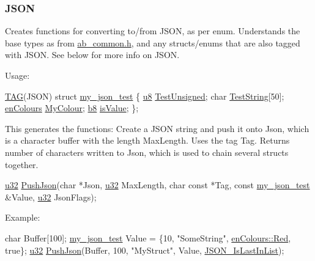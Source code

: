 \subsubsection*{J\+S\+ON}

Creates functions for converting to/from J\+S\+ON, as per enum. Understands the base types as from {\ttfamily \hyperlink{ab__common_8h}{ab\+\_\+common.\+h}}, and any structs/enums that are also tagged with {\ttfamily J\+S\+ON}. See below for more info on J\+S\+ON.

Usage\+: 
\begin{DoxyCode}
\hyperlink{Generated__001_8h_ad9b15e5b6d9b1ed55b76d9916ff6dec2}{TAG}(JSON)
\textcolor{keyword}{struct }\hyperlink{structmy__json__test}{my\_json\_test}
\{
    \hyperlink{ab__common_8h_a92c50087ca0e64fa93fc59402c55f8ca}{u8} \hyperlink{structmy__json__test_a0ea8af0c0061131955753275ad70dba4}{TestUnsigned};
    \textcolor{keywordtype}{char} \hyperlink{structmy__json__test_a497da009ff7ce7742cf99571b0752227}{TestString}[50];
    \hyperlink{PreprocTest_8h_a081cf1a0e70d6e2bd48c98f457742877}{enColours} \hyperlink{structmy__json__test_a6f1212d5aaf1f688e8887d5614d510ca}{MyColour};
    \hyperlink{ab__common_8h_a70e369648385b50f2d0588e8e8745275}{b8} \hyperlink{structmy__json__test_a55bffca96cce85232e33fc0c619a9eab}{isValue};
\};
\end{DoxyCode}


This generates the functions\+: Create a J\+S\+ON string and push it onto {\ttfamily Json}, which is a character buffer with the length {\ttfamily Max\+Length}. Uses the tag {\ttfamily Tag}. Returns number of characters written to {\ttfamily Json}, which is used to chain several structs together. 
\begin{DoxyCode}
\hyperlink{ab__common_8h_afaa62991928fb9fb18ff0db62a040aba}{u32} \hyperlink{test_8h_a2e06da4f01d3cba9c9d2cf6687ed8bd5}{PushJson}(\textcolor{keywordtype}{char} *Json, \hyperlink{ab__common_8h_afaa62991928fb9fb18ff0db62a040aba}{u32} MaxLength, \textcolor{keywordtype}{char} \textcolor{keyword}{const} *Tag, \textcolor{keyword}{const} 
      \hyperlink{structmy__json__test}{my\_json\_test} &Value, \hyperlink{ab__common_8h_afaa62991928fb9fb18ff0db62a040aba}{u32} JsonFlags);
\end{DoxyCode}


Example\+: 
\begin{DoxyCode}
\textcolor{keywordtype}{char} Buffer[100];
\hyperlink{structmy__json__test}{my\_json\_test} Value = \{10, \textcolor{stringliteral}{"SomeString"}, \hyperlink{PreprocTest_8h_a081cf1a0e70d6e2bd48c98f457742877aee38e4d5dd68c4e440825018d549cb47}{enColours::Red}, \textcolor{keyword}{true}\};
\hyperlink{ab__common_8h_afaa62991928fb9fb18ff0db62a040aba}{u32} \hyperlink{test_8h_a2e06da4f01d3cba9c9d2cf6687ed8bd5}{PushJson}(Buffer, 100, \textcolor{stringliteral}{"MyStruct"}, Value, \hyperlink{ab__json_8h_a23451be0e28c552e70c19429684f83cbab892e8229f95855a30a2c10fde71f78e}{JSON\_IsLastInList});
\end{DoxyCode}


